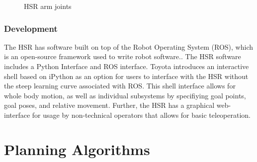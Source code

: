 \documentclass[11pt]{article}
\begin{document}
\begin{figure}[ht]
{                \label{fig:wrist-flex-joint}}
                \quad
                \centering
                \quad
                \caption{HSR arm joints}
                \label{fig:HSR-joints}
            \end{figure}
        \subsubsection{Development}    
            The HSR has software built on top of the Robot Operating System (ROS), which is an open-source framework used to write robot software.\cite{quigley_ros_2009}. The HSR software includes a Python Interface and ROS interface. Toyota introduces an interactive shell based on iPython as an option for users to interface with the HSR without the steep learning curve associated with ROS. This shell interface allows for whole body motion, as well as individual subsystems by specifiying goal points, goal poses, and relative movement. Further, the HSR has a graphical web-interface for usage by non-technical operators that allows for basic teleoperation.

    \newpage
\section{Planning Algorithms}
\end{document}
